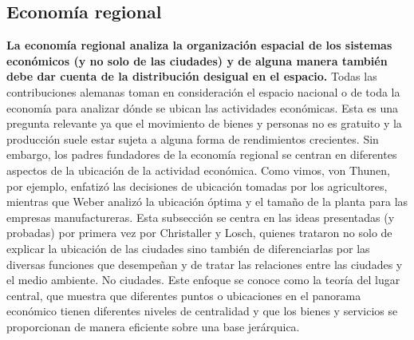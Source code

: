 \subsection{Economía regional}
\textbf{La economía regional analiza la organización espacial de los sistemas económicos (y no solo de las ciudades) y de alguna manera también debe dar cuenta de la distribución desigual en el espacio.} Todas las contribuciones alemanas toman en consideración el espacio nacional o de toda la economía para analizar dónde se ubican las actividades económicas. Esta es una pregunta relevante ya que el movimiento de bienes y personas no es gratuito y la producción suele estar sujeta a alguna forma de rendimientos crecientes. Sin embargo, los padres fundadores de la economía regional se centran en diferentes aspectos de la ubicación de la actividad económica. Como vimos, von Thunen, por ejemplo, enfatizó las decisiones de ubicación tomadas por los agricultores, mientras que Weber analizó la ubicación óptima y el tamaño de la planta para las empresas manufactureras. Esta subsección se centra en las ideas presentadas (y probadas) por primera vez por Christaller y Losch, quienes trataron no solo de explicar la ubicación de las ciudades sino también de diferenciarlas por las diversas funciones que desempeñan y de tratar las relaciones entre las ciudades y el medio ambiente. No ciudades. Este enfoque se conoce como la teoría del lugar central, que muestra que diferentes puntos o ubicaciones en el panorama económico tienen diferentes niveles de centralidad y que los bienes y servicios se proporcionan de manera eficiente sobre una base jerárquica.\\

